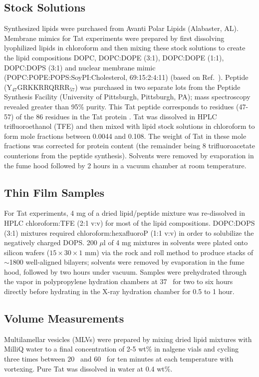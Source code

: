 \subsection{Stock Solutions}
Synthesized lipids were purchased from Avanti Polar Lipids (Alabaster, AL). 
Membrane mimics for Tat experiments were prepared by first 
dissolving lyophilized lipids in chloroform and then mixing these stock 
solutions to create the lipid compositions
DOPC, DOPC:DOPE (3:1), DOPC:DOPE (1:1), DOPC:DOPS (3:1) and nuclear membrane
mimic (POPC:POPE:POPS:SoyPI:Cholesterol, 69:15:2:4:11) (based on Ref.~\cite{Jarasch73}). 
Peptide (Y$_{47}$GRKKRRQRRR$_{57}$) was purchased in two separate lots from the 
Peptide Synthesis Facility (University of Pittsburgh, Pittsburgh, PA); 
mass spectroscopy revealed greater than 95\% purity. 
This Tat peptide corresponds to residues (47-57) of the 86 residues in the Tat 
protein \cite{Vives97}. 
Tat was dissolved in HPLC trifluoroethanol (TFE) and then mixed with lipid 
stock solutions in chloroform to form mole fractions between 0.0044 and 0.108. 
The weight of Tat in these mole fractions was corrected for protein content 
(the remainder being 8 trifluoroacetate counterions from the peptide synthesis). 
Solvents were removed by evaporation in the fume hood followed
by 2 hours in a vacuum chamber at room temperature.

\subsection{Thin Film Samples}
For Tat experiments, 4 mg of a dried lipid/peptide mixture was re-dissolved 
in HPLC chloroform:TFE (2:1 v:v) for most of the lipid compositions. 
DOPC:DOPS (3:1) mixtures required chloroform:hexafluoroP (1:1 v:v) in order to 
solubilize the negatively charged DOPS. 200 $\mu$l of 4 mg mixtures in 
solvents were plated onto silicon wafers ($15\times 30\times 1$ mm) via 
the rock and roll method \cite{Tristram-Nagle07_MMB} 
to produce stacks of $\sim$1800 well-aligned 
bilayers; solvents were removed by evaporation in the fume hood, followed by 
two hours under vacuum. Samples were prehydrated through the
vapor in polypropylene hydration chambers at 37 \textcelsius\ for two to six 
hours directly before hydrating in the X-ray hydration chamber 
\cite{Kucerka05_BPJ} for 0.5 to 1 hour. 

\subsection{Volume Measurements}\label{sec:volume_method}
Multilamellar vesicles (MLVs) were prepared by mixing dried lipid mixtures with 
MilliQ water to a final concentration of 2-5 wt\% in nalgene vials and cycling 
three times between 20 \textcelsius\ and 60 \textcelsius\ for ten minutes at 
each temperature with vortexing. Pure Tat was dissolved in water at 0.4 wt\%.

